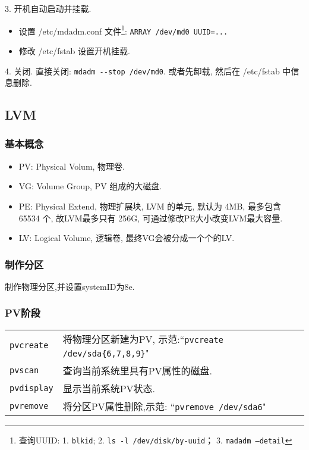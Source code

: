 \par
3. 开机自动启动并挂载.
\begin{itemize}
\item 设置 /etc/mdadm.conf 文件\footnote[1]{查询UUID: 1. \texttt{blkid}; 2. \texttt{ls -l /dev/disk/by-uuid}； 3. \texttt{madadm --detail}}: \verb|ARRAY /dev/md0 UUID=...|

\item 修改 /etc/fstab 设置开机挂载.
\end{itemize}

\par
4. 关闭. 直接关闭: \verb|mdadm --stop /dev/md0|. 或者先卸载, 然后在 /etc/fstab 中信息删除.

\subsection{LVM}
\subsubsection{基本概念}
\begin{itemize}
    \item PV: Physical Volum, 物理卷.
    
    \item VG: Volume Group, PV 组成的大磁盘.
    
    \item PE: Physical Extend, 物理扩展块, LVM 的单元, 默认为 4MB, 最多包含 65534 个, 故LVM最多只有 256G, 可通过修改PE大小改变LVM最大容量. 
        
    \item LV: Logical Volume, 逻辑卷, 最终VG会被分成一个个的LV.
\end{itemize}

\subsubsection{制作分区}
制作物理分区,并设置systemID为8e.

\subsubsection{PV阶段}
\begin{longtable}{l@{ : }p{}}\hline\hline

    \texttt{pvcreate} & 将物理分区新建为PV, 示范:\newline``\texttt{pvcreate /dev/sda\{6,7,8,9\}}"\\

    \texttt{pvscan} & 查询当前系统里具有PV属性的磁盘.\\

    \texttt{pvdisplay} & 显示当前系统PV状态.\\

    \texttt{pvremove} & 将分区PV属性删除,示范:\newline
        ``\texttt{pvremove /dev/sda6}"\\

    \hline
\end{longtable}

